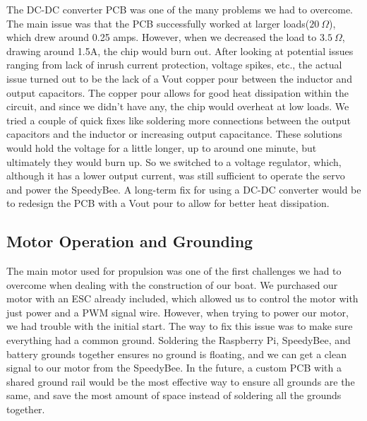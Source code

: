 The DC-DC converter PCB was one of the many problems we had to overcome. The main issue was that the PCB successfully worked at larger loads($20~\Omega$), which drew around 0.25 amps. However, when we decreased the load to $3.5~\Omega$, drawing around 1.5A, the chip would burn out. After looking at potential issues ranging from lack of inrush current protection, voltage spikes, etc., the actual issue turned out to be the lack of a Vout copper pour between the inductor and output capacitors. The copper pour allows for good heat dissipation within the circuit, and since we didn't have any, the chip would overheat at low loads. We tried a couple of quick fixes like soldering more connections between the output capacitors and the inductor or increasing output capacitance. These solutions would hold the voltage for a little longer, up to around one minute, but ultimately they would burn up. So we switched to a voltage regulator, which, although it has a lower output current, was still sufficient to operate the servo and power the SpeedyBee. A long-term fix for using a DC-DC converter would be to redesign the PCB with a Vout pour to allow for better heat dissipation.
\subsection{Motor Operation and Grounding}
The main motor used for propulsion was one of the first challenges we had to overcome when dealing with the construction of our boat. We purchased our motor with an ESC already included, which allowed us to control the motor with just power and a PWM signal wire. However, when trying to power our motor, we had trouble with the initial start. The way to fix this issue was to make sure everything had a common ground. Soldering the Raspberry Pi, SpeedyBee, and battery grounds together ensures no ground is floating, and we can get a clean signal to our motor from the SpeedyBee. In the future, a custom PCB with a shared ground rail would be the most effective way to ensure all grounds are the same, and save the most amount of space instead of soldering all the grounds together. 
